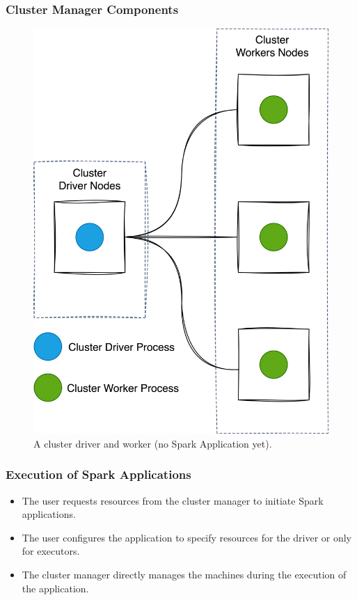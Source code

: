 \begin{frame}
    \frametitle{Cluster Manager Components}
    \begin{figure}
        \includegraphics[width=\textwidth,height=.7\textheight,keepaspectratio]{./Figures/chapter-04/cluster_manager_processes}
        \caption{A cluster driver and worker (no Spark Application yet).}\label{fig:cluster_manager_processes}
    \end{figure}
\end{frame}

\begin{frame}
    \frametitle{Execution of Spark Applications}
    \begin{itemize}
        \item The user requests resources from the cluster manager to initiate Spark applications.
        \item The user configures the application to specify resources for the driver or only for executors.
        \item The cluster manager directly manages the machines during the execution of the application.
    \end{itemize}
\end{frame}

